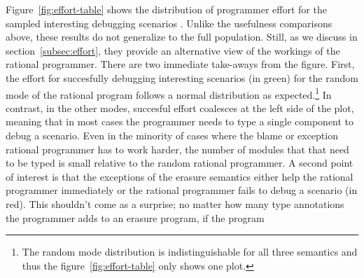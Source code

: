 Figure~\ref{fig:effort-table} shows the distribution of programmer effort
for  the sampled interesting debugging scenarios . Unlike the usefulness
comparisons above, these results do not generalize to the full population.
Still, as we discuss in section~\ref{subsec:effort}, they provide an
alternative view of the workings of the rational programmer. There are two
immediate take-aways from the figure. First, the effort for succesfully
debugging interesting scenarios (in green) for the random mode of the
rational program  follows  a normal distribution as expected.\footnote{The
random mode distribution is indistinguishable for all three semantics and thus the figure~\ref{fig:effort-table} 
only shows one plot.} In contrast, in the other modes, succesful effort coalesces at
the left side of the plot, meaning that in most cases the programmer needs
to type a single component to debug a scenario. Even in the minority of
cases where the blame or exception rational programmer has to work harder, the number of
modules that that need to be typed is small relative to the random
rational programmer. A second point of interest is that the exceptions of
the erasure semantics either help the rational programmer immediately or 
the rational programmer fails to debug a scenario (in red). This shouldn't
come as a surprise; no matter how many type annotations the programmer
adds to an erasure program, if the program 

